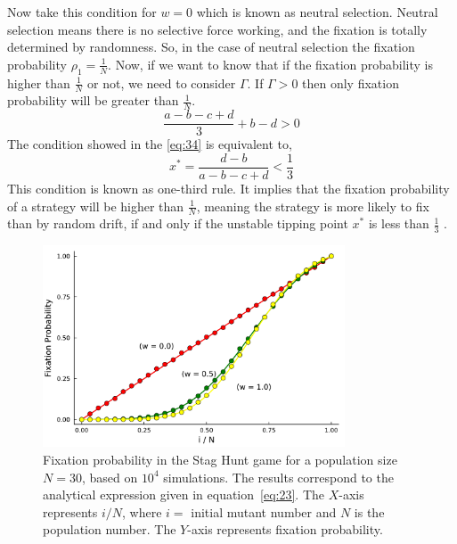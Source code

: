 \documentclass{article}
\begin{document}
Now take this condition for $w=0$ which is known as neutral selection.
Neutral selection means there is no selective force working, and the fixation is totally determined by randomness.
So, in the case of neutral selection the fixation probability $\rho_1 = \frac{1}{N}$.
Now, if we want to know that if the fixation probability is higher than $\frac{1}{N}$ or not, we need to consider $\Gamma$.
If $\Gamma>0$ then only fixation probability will be greater than $\frac{1}{N}$.
\begin{equation}
\frac{a-b-c+d}{3}+ b-d > 0 \label{eq:34}
\end{equation}
The condition showed in the \eqref{eq:34} is equivalent to,
\begin{equation}
x^* = \frac{d-b}{a-b-c+d}<\frac{1}{3} \label{eq:35}
\end{equation}
This condition is known as one-third rule.
It implies that the fixation probability of a strategy will be higher than $\frac{1}{N}$, meaning the strategy is more likely to fix than by random drift, if and only if the unstable tipping point $x^*$ is less than $\frac{1}{3}$ \citep{Ohtsuki2007}.
\begin{figure}[H]
    \centering
    \includegraphics[width=0.8\textwidth]{SH_FP_SIM.pdf}
    \caption{Fixation probability in the Stag Hunt game for a population size $N = 30$, based on $10^4$ simulations. The results correspond to the analytical expression given in equation~\eqref{eq:23}. The $X$-axis represents $i/N$, where $i=$ initial mutant number and $N$ is the population number. The $Y$-axis represents fixation probability.}
    \label{fig:5}
\end{figure}
\end{document}

